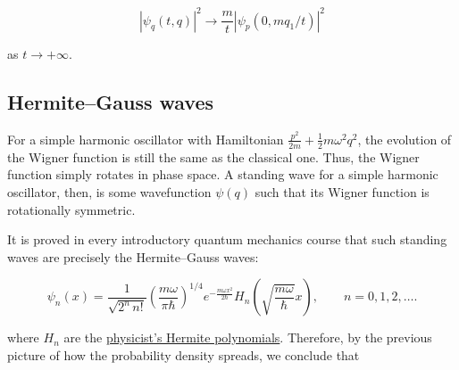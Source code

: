 $$
|\psi_q(t, q)|^2 \to \frac{m}{t}|\psi_p(0, mq_1 / t)|^2
$$

as $t \to +\infty$.

\subsection{Hermite--Gauss waves}

For a simple harmonic oscillator with Hamiltonian
$\frac{p^2}{2m} + \frac 12 m\omega^2 q^2$, the evolution of the Wigner
function is still the same as the classical one. Thus, the Wigner
function simply rotates in phase space. A standing wave for a simple
harmonic oscillator, then, is some wavefunction $\psi(q)$ such that
its Wigner function is rotationally symmetric.

It is proved in every introductory quantum mechanics course that such
standing waves are precisely the Hermite--Gauss waves:

$$
\psi_n(x) = \frac{1}{\sqrt{2^n\,n!}}  \left(\frac{m\omega}{\pi \hbar}\right)^{1/4}  e^{
- \frac{m\omega x^2}{2 \hbar}} H_n\left(\sqrt{\frac{m\omega}{\hbar}} x \right), \qquad n = 0,1,2,\ldots.
$$

where $H_n$ are the
\href{https://en.wikipedia.org/wiki/Hermite_polynomials}{physicist's
Hermite polynomials}. Therefore, by the previous picture of how the
probability density spreads, we conclude that

